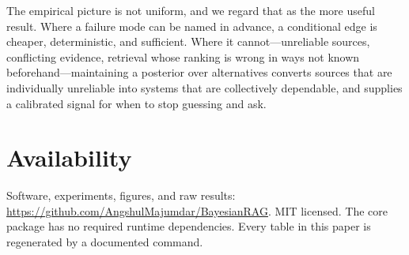 \documentclass[11pt,a4paper]{article}
\begin{document}
The empirical picture is not uniform, and we regard that as the more useful
result. Where a failure mode can be named in advance, a conditional edge is
cheaper, deterministic, and sufficient. Where it cannot---unreliable sources,
conflicting evidence, retrieval whose ranking is wrong in ways not known
beforehand---maintaining a posterior over alternatives converts sources that
are individually unreliable into systems that are collectively dependable, and
supplies a calibrated signal for when to stop guessing and ask.

\section*{Availability}

Software, experiments, figures, and raw results:
\url{https://github.com/AngshulMajumdar/BayesianRAG}. MIT licensed. The core
package has no required runtime dependencies. Every table in this paper is
regenerated by a documented command.
\end{document}
